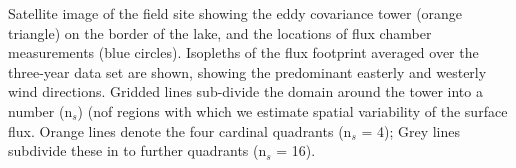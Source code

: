 \label{fig:fp_on_map_Stordalen} Satellite image of the field
site showing the eddy covariance tower (orange triangle) on the border
of the lake, and the locations of flux chamber measurements (blue
circles). Isopleths of the flux footprint averaged over the three-year
data set are shown, showing the predominant easterly and westerly wind
directions. Gridded lines sub-divide the domain around the tower into a
number (n\(_s\)) (nof regions with which we estimate spatial variability of
the surface flux. Orange lines denote the four cardinal quadrants
(n\(_s\) = 4); Grey lines subdivide these in to further quadrants
(n\(_s\) = 16).